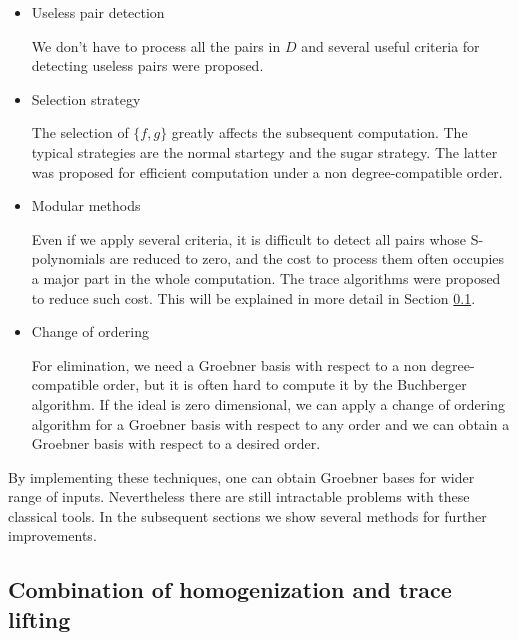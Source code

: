 \documentclass[runningheads]{cl2emult}
\begin{document}
\begin{itemize}
\item Useless pair detection

We don't have to process all the pairs in $D$ and several useful
criteria for detecting useless pairs were proposed.

\item Selection strategy

The selection of $\{f,g\}$ greatly affects the subsequent computation.
The typical strategies are the normal startegy and the sugar strategy.
The latter was proposed for efficient computation under a non 
degree-compatible order.

\item Modular methods

Even if we apply several criteria, it is difficult to detect all pairs
whose S-polynomials are reduced to zero, and the cost to process them
often occupies a major part in the whole computation. The trace algorithms
were proposed to reduce such cost. This will be explained in more detail
in Section \ref{gbhomo}.

\item Change of ordering

For elimination, we need a Groebner basis with respect to a non
degree-compatible order, but it is often hard to compute it by
the Buchberger algorithm. If the ideal is zero dimensional, we
can apply a change of ordering algorithm for a Groebner basis
with respect to any order and we can obtain a Groebner basis
with respect to a desired order.

\end{itemize}
By implementing these techniques, one can obtain Groebner bases for
wider range of inputs. Nevertheless there are still intractable
problems with these classical tools. In the subsequent sections
we show several methods for further improvements.

\subsection{Combination of homogenization and trace lifting}
\label{gbhomo}
\end{document}
